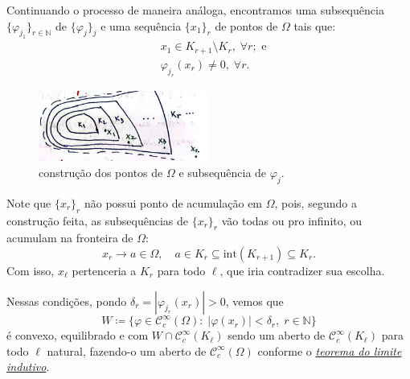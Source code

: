 \documentclass[../distribution_theory_notes.tex]{subfiles}
\begin{document}
\begin{proof*}
                 Continuando o processo de maneira análoga, encontramos uma subsequência \(\{\varphi_{j_1}\}_{r\in \mathbb{N}}\) de \(\{\varphi_{j}\}_{j}\) e uma sequência \(\{x_1\}_{r}\) de pontos de \(\Omega \) tais que: 
                \begin{align*}
                  & x_1\in K_{r+1}\setminus{K_r},\; \forall r; \text{ e}\\ 
                  & \varphi_{j_r}(x_r)\neq 0,\; \forall r.
                \end{align*}
               \begin{figure}[H]
               \begin{center}
               \includegraphics[height=0.5\textheight, width=0.5\textwidth, keepaspectratio]{./Images/points_construction_06.png}
               \end{center}
               \caption{construção dos pontos de \(\Omega \) e subsequência de \({\varphi_{j}}\).}
               \end{figure}

               Note que \(\{x_r\}_r\) não possui ponto de acumulação em \(\Omega \), pois, segundo a construção feita, as subsequências de \(\{x_r\}_r\) vão todas ou pro infinito, ou acumulam na fronteira de \(\Omega \): 
                 \[
                   x_r\rightarrow a\in \Omega,\quad a\in K_r \subseteq \mathrm{int}(K_{r+1})\subseteq K_r.
                 \]
                 Com isso, \(x_{\ell }\) pertenceria a \(K_r\) para todo \(\ell \), que iria contradizer sua escolha.

                 Nessas condições, pondo \(\delta_r = |\varphi_{j_r}(x_r)|>0\), vemos que 
                   \[
                     W\coloneqq \{\varphi\in \mathcal{C}_{c}^{\infty}(\Omega ):\; |\varphi(x_r)|<\delta_r,\; r\in \mathbb{N}\}
                   \]
                   é convexo, equilibrado e com \(W\cap \mathcal{C}_{c}^{\infty}(K_{\ell})\) sendo um aberto de \(\mathcal{C}_{c}^{\infty}(K_{\ell})\) para todo \(\ell \) natural, fazendo-o um aberto de \(\mathcal{C}_{c}^{\infty}(\Omega )\) conforme o \hyperlink{inductive_limit}{\textit{teorema do limite indutivo}}.


\end{proof*}
\end{document}
